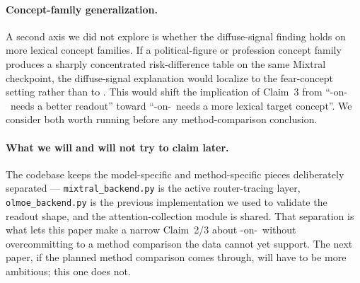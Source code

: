 \paragraph{Concept-family generalization.}
A second axis we did not explore is whether the diffuse-signal finding
holds on more lexical concept families. If a political-figure or
profession concept family produces a sharply concentrated
risk-difference table on the same Mixtral checkpoint, the diffuse-signal
explanation would localize to the fear-concept setting rather than to
\mixtral. This would shift the implication of Claim~3 from
``\steermoe-on-\mixtral~needs a better readout'' toward
``\steermoe-on-\mixtral~needs a more lexical target concept''. We
consider both worth running before any method-comparison conclusion.

\paragraph{What we will and will not try to claim later.}
The codebase keeps the model-specific and method-specific pieces
deliberately separated --- \texttt{mixtral\_backend.py} is the active
router-tracing layer, \texttt{olmoe\_backend.py} is the previous
implementation we used to validate the readout shape, and the
attention-collection module is shared. That separation is what lets
this paper make a narrow Claim~2/3 about \steermoe-on-\mixtral~without
overcommitting to a method comparison the data cannot yet support.
The next paper, if the planned method comparison comes through, will
have to be more ambitious; this one does not.
